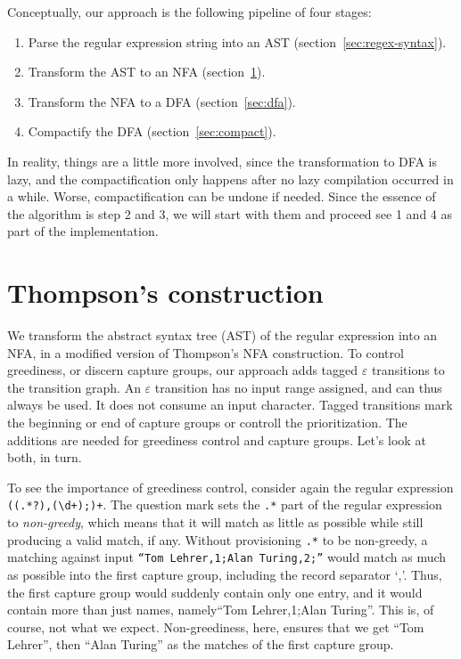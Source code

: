\documentclass[11pt]{Thesis}
\theoremstyle{definition}
\newcommand{\Secref}[1]{section~\ref{sec:#1}}
\newcommand{\seclabel}[1]{\label{sec:#1}}
\begin{document}
Conceptually, our approach is the following pipeline of four stages:
\begin{enumerate}
  \item Parse the regular expression string into an AST (\Secref{regex-syntax}).
  \item Transform the AST to an NFA (\Secref{thompson}).
  \item Transform the NFA to a DFA (\Secref{dfa}).
  \item Compactify the DFA (\Secref{compact}).
\end{enumerate}

In reality, things are a little more involved, since the transformation
to DFA is lazy, and the compactification only happens after no lazy
compilation occurred in a while. Worse, compactification can be
undone if needed. Since the essence of the algorithm is step 2 and 3, 
we will start with them and proceed see 1 and 4 as part of the implementation.

\section{Thompson's construction} 	\seclabel{thompson}

We transform the abstract syntax tree (AST) of the regular expression into an NFA,
in a modified version of Thompson's NFA construction. To
control greediness, or discern capture groups, our approach adds tagged
$\varepsilon$ transitions to the transition graph. An
$\varepsilon$ transition has no input range assigned, and can thus always
be used. It does not consume an input character. Tagged transitions 
mark the beginning or end of capture groups or controll the prioritization.
The additions are needed for greediness control and capture groups.
Let's look at both, in turn.

To see the importance of greediness control, consider again the regular
expression \texttt{((.*?),(\textbackslash{}d+);)+}. The question
mark sets the \texttt{.*} part of the regular expression to
\emph{non-greedy}, which means that it will match as little as
possible while still producing a valid match, if any.  Without
provisioning \texttt{.*} to be non-greedy, a matching against input
\texttt{``Tom Lehrer,1;Alan Turing,2;''} would match as much as
possible into the first capture group, including the record separator
`,'.  Thus, the first capture group would suddenly contain only one
entry, and it would contain more than just names, namely``Tom
Lehrer,1;Alan Turing''.  This is, of course, not what we expect.
Non-greediness, here, ensures that we get ``Tom Lehrer'', then
``Alan Turing'' as the matches of the first capture group.
\end{document}
